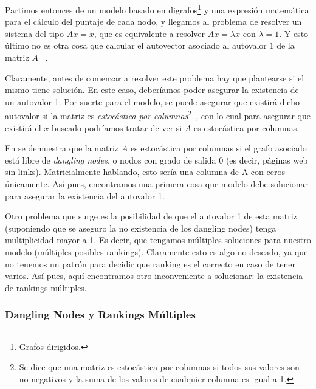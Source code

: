 \par Partimos entonces de un modelo basado en digrafos\footnote{Grafos
dirigidos.} y una expresi\'on matem\'atica para el c\'alculo del puntaje de cada
nodo, y llegamos al problema de resolver un sistema del tipo $Ax = x$, que es
equivalente a resolver $Ax = \lambda x$ con $\lambda = 1$. Y esto \'ultimo no es
otra cosa que calcular el autovector asociado al autovalor $1$ de la matriz $A$
~\cite[p.~443]{Burden2010}.

\par Claramente, antes de comenzar a resolver este problema hay que plantearse
si el mismo tiene soluci\'on. En este caso, deber\'iamos poder asegurar la
existencia de un autovalor 1. Por suerte para el modelo, se puede asegurar que
existir\'a dicho autovalor si la matriz es \emph{estoc\'astica por
columnas}\footnote{Se dice que una matriz es estoc\'astica por columnas si todos
sus valores son no negativos y la suma de los valores de cualquier columna es
igual a 1.}~\cite[p.572]{Bryan2006}, con lo cual para asegurar que existir\'a el
$x$ buscado podr\'iamos tratar de ver si $A$ es estoc\'astica por
columnas.

\par En \cite[p.572]{Bryan2006} se demuestra que la matriz $A$ es estoc\'astica
por columnas si el grafo asociado est\'a libre de \emph{dangling nodes}, o
nodos con grado de salida 0 (es decir, p\'aginas web sin links). Matricialmente
hablando, esto ser\'ia una columna de A con ceros \'unicamente. As\'i pues,
encontramos una primera cosa que modelo debe solucionar para asegurar la
existencia del autovalor 1.

\par Otro problema que surge es la posibilidad de que el autovalor 1 de esta
matriz (suponiendo que se aseguro la no existencia de los dangling nodes) tenga
multiplicidad mayor a 1. Es decir, que tengamos m\'ultiples soluciones para
nuestro modelo (m\'ultiples posibles rankings). Claramente esto es algo no
deseado, ya que no tenemos un patr\'on para decidir que ranking es el correcto
en caso de tener varios. As\'i pues, aqu\'i encontramos otro inconveniente a
solucionar: la existencia de rankings m\'ultiples.


\subsubsection{Dangling Nodes y Rankings M\'ultiples}

